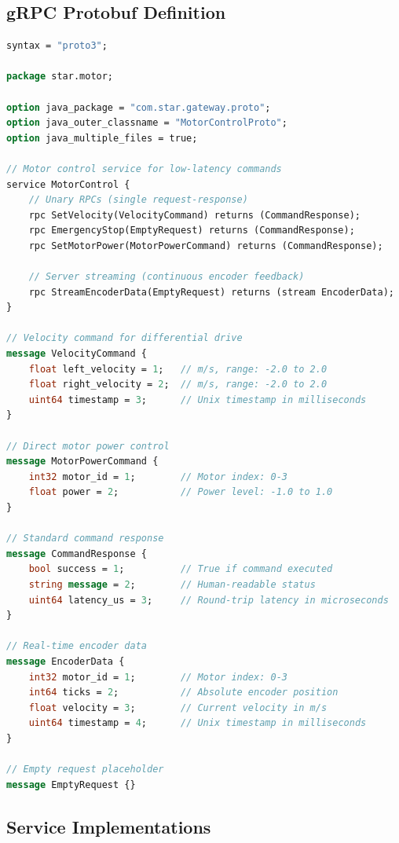 \subsection{gRPC Protobuf Definition}

\begin{lstlisting}[language=Protobuf, caption=motor\_control.proto]
syntax = "proto3";

package star.motor;

option java_package = "com.star.gateway.proto";
option java_outer_classname = "MotorControlProto";
option java_multiple_files = true;

// Motor control service for low-latency commands
service MotorControl {
    // Unary RPCs (single request-response)
    rpc SetVelocity(VelocityCommand) returns (CommandResponse);
    rpc EmergencyStop(EmptyRequest) returns (CommandResponse);
    rpc SetMotorPower(MotorPowerCommand) returns (CommandResponse);

    // Server streaming (continuous encoder feedback)
    rpc StreamEncoderData(EmptyRequest) returns (stream EncoderData);
}

// Velocity command for differential drive
message VelocityCommand {
    float left_velocity = 1;   // m/s, range: -2.0 to 2.0
    float right_velocity = 2;  // m/s, range: -2.0 to 2.0
    uint64 timestamp = 3;      // Unix timestamp in milliseconds
}

// Direct motor power control
message MotorPowerCommand {
    int32 motor_id = 1;        // Motor index: 0-3
    float power = 2;           // Power level: -1.0 to 1.0
}

// Standard command response
message CommandResponse {
    bool success = 1;          // True if command executed
    string message = 2;        // Human-readable status
    uint64 latency_us = 3;     // Round-trip latency in microseconds
}

// Real-time encoder data
message EncoderData {
    int32 motor_id = 1;        // Motor index: 0-3
    int64 ticks = 2;           // Absolute encoder position
    float velocity = 3;        // Current velocity in m/s
    uint64 timestamp = 4;      // Unix timestamp in milliseconds
}

// Empty request placeholder
message EmptyRequest {}
\end{lstlisting}

\subsection{Service Implementations}


